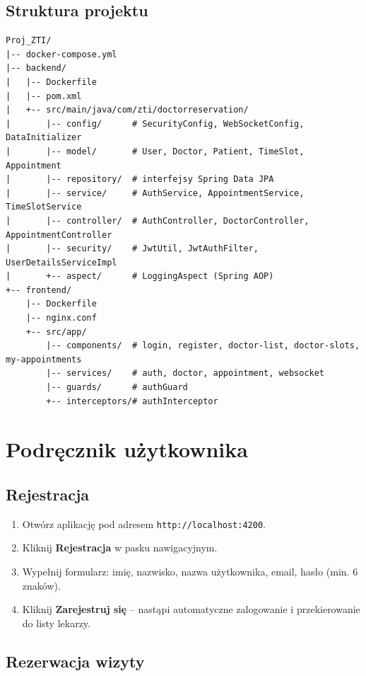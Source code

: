 \documentclass[12pt, a4paper]{article}
\begin{document}
\subsection{Struktura projektu}

\begin{lstlisting}[style=bash]
Proj_ZTI/
|-- docker-compose.yml
|-- backend/
|   |-- Dockerfile
|   |-- pom.xml
|   +-- src/main/java/com/zti/doctorreservation/
|       |-- config/      # SecurityConfig, WebSocketConfig, DataInitializer
|       |-- model/       # User, Doctor, Patient, TimeSlot, Appointment
|       |-- repository/  # interfejsy Spring Data JPA
|       |-- service/     # AuthService, AppointmentService, TimeSlotService
|       |-- controller/  # AuthController, DoctorController, AppointmentController
|       |-- security/    # JwtUtil, JwtAuthFilter, UserDetailsServiceImpl
|       +-- aspect/      # LoggingAspect (Spring AOP)
+-- frontend/
    |-- Dockerfile
    |-- nginx.conf
    +-- src/app/
        |-- components/  # login, register, doctor-list, doctor-slots, my-appointments
        |-- services/    # auth, doctor, appointment, websocket
        |-- guards/      # authGuard
        +-- interceptors/# authInterceptor
\end{lstlisting}

\section{Podręcznik użytkownika}

\subsection{Rejestracja}

\begin{enumerate}
  \item Otwórz aplikację pod adresem \texttt{http://localhost:4200}.
  \item Kliknij \textbf{Rejestracja} w pasku nawigacyjnym.
  \item Wypełnij formularz: imię, nazwisko, nazwa użytkownika, email, hasło (min. 6 znaków).
  \item Kliknij \textbf{Zarejestruj się} -- nastąpi automatyczne zalogowanie i przekierowanie do listy lekarzy.
\end{enumerate}

\subsection{Rezerwacja wizyty}
\end{document}
